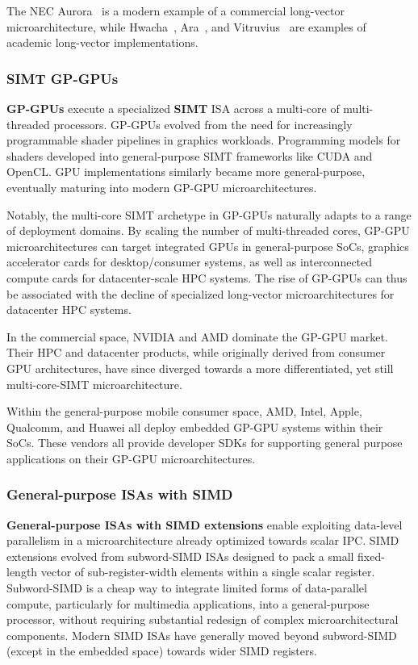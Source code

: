 The NEC Aurora~\cite{nec_aurora} is a modern example of a commercial long-vector microarchitecture, while Hwacha~\cite{hwacha_manual}, Ara~\cite{ara2}, and Vitruvius~\cite{minervini_vitruvius_2023} are examples of academic long-vector implementations.

\subsubsection{SIMT GP-GPUs}

\textbf{GP-GPUs} execute a specialized \textbf{SIMT} ISA across a multi-core of multi-threaded processors.
GP-GPUs evolved from the need for increasingly programmable shader pipelines in graphics workloads.
Programming models for shaders developed into general-purpose SIMT frameworks like CUDA and OpenCL.
GPU implementations similarly became more general-purpose, eventually maturing into modern GP-GPU microarchitectures.

Notably, the multi-core SIMT archetype in GP-GPUs naturally adapts to a range of deployment domains.
By scaling the number of multi-threaded cores, GP-GPU microarchitectures can target integrated GPUs in general-purpose SoCs, graphics accelerator cards for desktop/consumer systems, as well as interconnected compute cards for datacenter-scale HPC systems.
The rise of GP-GPUs can thus be associated with the decline of specialized long-vector microarchitectures for datacenter HPC systems.

In the commercial space, NVIDIA and AMD dominate the GP-GPU market.
Their HPC and datacenter products, while originally derived from consumer GPU architectures, have since diverged towards a more differentiated, yet still multi-core-SIMT microarchitecture.

Within the general-purpose mobile consumer space, AMD, Intel, Apple, Qualcomm, and Huawei all deploy embedded GP-GPU systems within their SoCs.
These vendors all provide developer SDKs for supporting general purpose applications on their GP-GPU microarchitectures.


\subsubsection{General-purpose ISAs with SIMD}

\textbf{General-purpose ISAs with SIMD extensions} enable exploiting data-level parallelism in a microarchitecture already optimized towards scalar IPC.
SIMD extensions evolved from subword-SIMD ISAs designed to pack a small fixed-length vector of sub-register-width elements within a single scalar register.
Subword-SIMD is a cheap way to integrate limited forms of data-parallel compute, particularly for multimedia applications, into a general-purpose processor, without requiring substantial redesign of complex microarchitectural components.
Modern SIMD ISAs have generally moved beyond subword-SIMD (except in the embedded space) towards wider SIMD registers.

